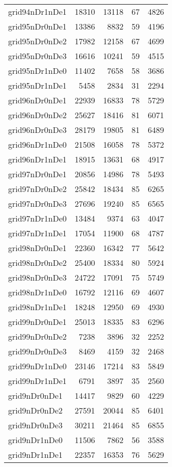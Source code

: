 \begin{longtable}{lrrrr}
grid94nDr1nDe1 & 18310 & 13118 & 67 & 4826 \\
grid95nDr0nDe1 & 13386 & 8832 & 59 & 4196 \\
grid95nDr0nDe2 & 17982 & 12158 & 67 & 4699 \\
grid95nDr0nDe3 & 16616 & 10241 & 59 & 4515 \\
grid95nDr1nDe0 & 11402 & 7658 & 58 & 3686 \\
grid95nDr1nDe1 & 5458 & 2834 & 31 & 2294 \\
grid96nDr0nDe1 & 22939 & 16833 & 78 & 5729 \\
grid96nDr0nDe2 & 25627 & 18416 & 81 & 6071 \\
grid96nDr0nDe3 & 28179 & 19805 & 81 & 6489 \\
grid96nDr1nDe0 & 21508 & 16058 & 78 & 5372 \\
grid96nDr1nDe1 & 18915 & 13631 & 68 & 4917 \\
grid97nDr0nDe1 & 20856 & 14986 & 78 & 5493 \\
grid97nDr0nDe2 & 25842 & 18434 & 85 & 6265 \\
grid97nDr0nDe3 & 27696 & 19240 & 85 & 6565 \\
grid97nDr1nDe0 & 13484 & 9374 & 63 & 4047 \\
grid97nDr1nDe1 & 17054 & 11900 & 68 & 4787 \\
grid98nDr0nDe1 & 22360 & 16342 & 77 & 5642 \\
grid98nDr0nDe2 & 25400 & 18334 & 80 & 5924 \\
grid98nDr0nDe3 & 24722 & 17091 & 75 & 5749 \\
grid98nDr1nDe0 & 16792 & 12116 & 69 & 4607 \\
grid98nDr1nDe1 & 18248 & 12950 & 69 & 4930 \\
grid99nDr0nDe1 & 25013 & 18335 & 83 & 6296 \\
grid99nDr0nDe2 & 7238 & 3896 & 32 & 2252 \\
grid99nDr0nDe3 & 8469 & 4159 & 32 & 2468 \\
grid99nDr1nDe0 & 23146 & 17214 & 83 & 5849 \\
grid99nDr1nDe1 & 6791 & 3897 & 35 & 2560 \\
grid9nDr0nDe1 & 14417 & 9829 & 60 & 4229 \\
grid9nDr0nDe2 & 27591 & 20044 & 85 & 6401 \\
grid9nDr0nDe3 & 30211 & 21464 & 85 & 6855 \\
grid9nDr1nDe0 & 11506 & 7862 & 56 & 3588 \\
grid9nDr1nDe1 & 22357 & 16353 & 76 & 5629 \\

\end{longtable}

